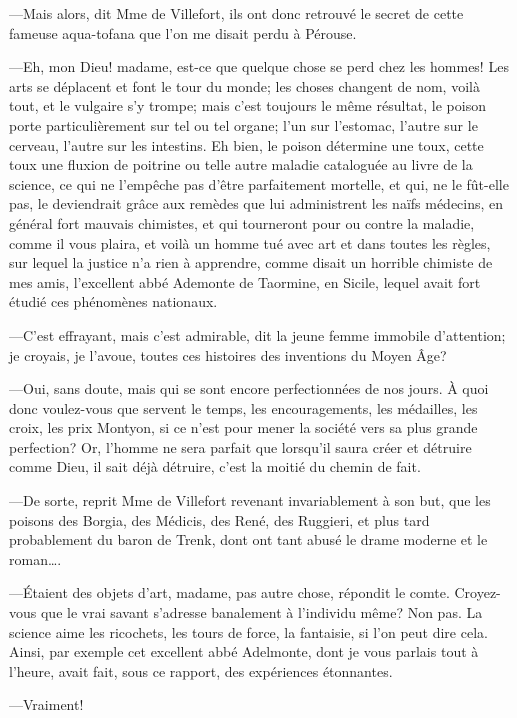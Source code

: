 —Mais alors, dit Mme de Villefort, ils ont donc retrouvé le secret de cette fameuse aqua-tofana que l'on me disait perdu à Pérouse. 

—Eh, mon Dieu! madame, est-ce que quelque chose se perd chez les hommes! Les arts se déplacent et font le tour du monde; les choses changent de nom, voilà tout, et le vulgaire s'y trompe; mais c'est toujours le même résultat, le poison porte particulièrement sur tel ou tel organe; l'un sur l'estomac, l'autre sur le cerveau, l'autre sur les intestins. Eh bien, le poison détermine une toux, cette toux une fluxion de poitrine ou telle autre maladie cataloguée au livre de la science, ce qui ne l'empêche pas d'être parfaitement mortelle, et qui, ne le fût-elle pas, le deviendrait grâce aux remèdes que lui administrent les naïfs médecins, en général fort mauvais chimistes, et qui tourneront pour ou contre la maladie, comme il vous plaira, et voilà un homme tué avec art et dans toutes les règles, sur lequel la justice n'a rien à apprendre, comme disait un horrible chimiste de mes amis, l'excellent abbé Ademonte de Taormine, en Sicile, lequel avait fort étudié ces phénomènes nationaux. 

—C'est effrayant, mais c'est admirable, dit la jeune femme immobile d'attention; je croyais, je l'avoue, toutes ces histoires des inventions du Moyen Âge? 

—Oui, sans doute, mais qui se sont encore perfectionnées de nos jours. À quoi donc voulez-vous que servent le temps, les encouragements, les médailles, les croix, les prix Montyon, si ce n'est pour mener la société vers sa plus grande perfection? Or, l'homme ne sera parfait que lorsqu'il saura créer et détruire comme Dieu, il sait déjà détruire, c'est la moitié du chemin de fait. 

—De sorte, reprit Mme de Villefort revenant invariablement à son but, que les poisons des Borgia, des Médicis, des René, des Ruggieri, et plus tard probablement du baron de Trenk, dont ont tant abusé le drame moderne et le roman\dots. 

—Étaient des objets d'art, madame, pas autre chose, répondit le comte. Croyez-vous que le vrai savant s'adresse banalement à l'individu même? Non pas. La science aime les ricochets, les tours de force, la fantaisie, si l'on peut dire cela. Ainsi, par exemple cet excellent abbé Adelmonte, dont je vous parlais tout à l'heure, avait fait, sous ce rapport, des expériences étonnantes. 

—Vraiment! 

